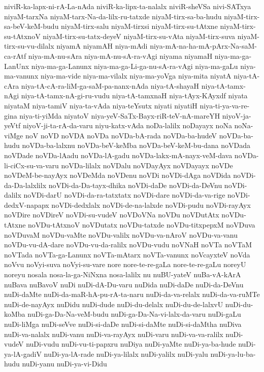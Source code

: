 {niviR-ka-lapx-ni-rA-La-nAda
niviR-ka-lipx-ta-nalalx
niviR-sheVSa
nivi-SATxya
niyaM-tarxNa
niyaM-tarx-Na-da-lilx-ru-tatxde
niyaM-tirx-sa-ba-hudu
niyaM-tirx-sa-beV-keM-budu
niyaM-tirx-salu
niyaM-tirxsi
niyaM-tirx-su-tAtxne
niyaM-tirx-su-tAtxnoV
niyaM-tirx-su-tatx-deyeV
niyaM-tirx-su-vAta
niyaM-tirx-suva
niyaM-tirx-su-vu-dilalx
niyamA
niyamAH
niya-mAdi
niya-mA-na-ha-mA-pArx-Na-saM-ca-rAtf
niya-mA-nu-sAra
niya-mA-nu-sA-ra-vAgi
niyama
niyamaH
niya-ma-ga-LanUnx
niya-ma-ga-Lanunx
niya-ma-ga-Li-ga-nu-sA-ra-vAgi
niya-ma-gaLu
niya-ma-vanunx
niya-ma-vide
niya-ma-vilalx
niya-ma-yoVga
niya-mita
niyatA
niya-tA-cAra
niya-tA-cA-ra-liM-ga-saM-pa-nanx-nAda
niya-tA-shayaH
niya-tA-tamx-nAgi
niya-tA-tamx-nA-gi-ru-vudu
niya-tA-tamxnaH
niya-tAyx-KAyxdf
niyata
niyataM
niya-tamiV
niya-ta-vAda
niya-teYsutx
niyati
niyatiH
niya-ti-ya-va-re-gina
niya-ti-yiMda
niyatoV
niya-yeV-SaTx-Bayx-riR-teV-nA-mareYH
niyoV-ja-yeVtf
niyoV-ji-ta-rA-da-varu
niyu-katx-vAda
noDa-lalilx
noDayayx
noNa
noNa-viMge
noV
noVD
noVDA
noVDa
noVDa-bA-rada
noVDa-ba-hudeV
noVDa-ba-hudu
noVDa-ba-lalxnu
noVDa-beV-keMba
noVDa-beV-keM-bu-dana
noVDada
noVDade
noVDa-lAadu
noVDa-lA-gadu
noVDa-lakx-mA-nayx-veM-dava
noVDa-li-ciCx-su-va-varu
noVDa-lilalx
noVDalu
noVDayAyx
noVDayayx
noVDe
noVDeM-be-nayAyx
noVDeMda
noVDenu
noVDi
noVDi-dAga
noVDida
noVDi-da-Da-lalxlilx
noVDi-da-Da-tayx-dhika
noVDi-daDe
noVDi-da-DeVnu
noVDi-dalilx
noVDi-darU
noVDi-da-ra-tatxtatx
noVDi-dare
noVDi-da-va-rige
noVDi-dedxV-napapx
noVDi-dedxlalx
noVDi-de-na-lalxde
noVDi-pudu
noVDi-rayAyx
noVDire
noVDireV
noVDi-su-vudeV
noVDoVNa
noVDu
noVDutAtx
noVDu-tAtxne
noVDu-tAtxnoV
noVDutatx
noVDu-tatxde
noVDu-titxpepxM
noVDuva
noVDuvaM
noVDu-vaMte
noVDu-valilx
noVDu-va-nAroV
noVDu-va-vanu
noVDu-vu-dA-dare
noVDu-vu-da-ralilx
noVDu-vudu
noVNaH
noVTa
noVTaM
noVTada
noVTa-ga-Lanunx
noVTa-mAtarx
noVTa-vanunx
noVcayxteV
noVda
noVvu
noVyi-suva
noVyi-su-vare
nore
nore-te-re-gaLa
nore-te-re-gaLu
noreyU
noreyu
nosala
nosa-la-ga-NiNxna
nosa-lalilx
nu
nuBU-yateV
nuBa-vA-kArA
nuBava
nuBavoV
nuDi
nuDi-dA-Du-varu
nuDida
nuDi-daDe
nuDi-da-DeVnu
nuDi-daMte
nuDi-da-maR-hA-pu-rA-ta-naru
nuDi-da-va-relalx
nuDi-da-va-ruMTe
nuDi-de-nayAyx
nuDidu
nuDi-dude
nuDi-du-delalx
nuDi-du-de-lalxvU
nuDi-du-koMba
nuDi-ga-Da-Na-veM-budu
nuDi-ga-Da-Na-vi-lalx-da-varu
nuDi-gaLu
nuDi-liMga
nuDi-seVve
nuDi-si-daDe
nuDi-si-daMte
nuDi-si-daMtha
nuDiva
nuDi-va-nalalx
nuDi-vanu
nuDi-va-rayAyx
nuDi-varu
nuDi-va-va-ralilx
nuDi-vudeV
nuDi-vudu
nuDi-vu-ti-papxru
nuDiya
nuDi-yaMte
nuDi-ya-ba-hude
nuDi-ya-lA-gadiV
nuDi-ya-lA-rade
nuDi-ya-lilalx
nuDi-yalilx
nuDi-yalu
nuDi-ya-lu-ba-hudu
nuDi-yanu
nuDi-ya-vi-Didu
}
